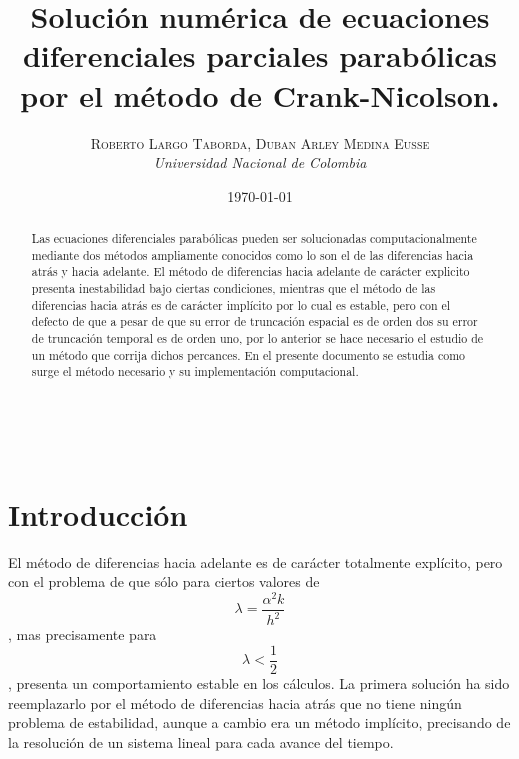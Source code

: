 \documentclass[11pt]{article} %
\title{\textbf{Solución numérica de ecuaciones diferenciales parciales parabólicas por el método de Crank-Nicolson.}\\ %
}
\author{\textsc{Roberto Largo Taborda, Duban Arley Medina Eusse} %
\\{\textit{Universidad Nacional de Colombia}}} %
\date{\today} %
\makeatletter
\renewcommand{\maketitle}{ %
\begin{flushright} %
{\LARGE\@title} %

\vspace{50pt} %

{\large\@author} %
\\\@date %

\vspace{40pt} %
\end{flushright}
}
\makeatother
\begin{document}
\maketitle %


\renewcommand{\abstractname}{Resumen} %

\begin{abstract}
Las ecuaciones diferenciales parabólicas pueden ser solucionadas computacionalmente mediante dos métodos ampliamente conocidos como lo son el de las diferencias hacia atrás y hacia adelante. El método de diferencias hacia adelante de carácter explicito presenta inestabilidad bajo ciertas condiciones, mientras que el método de las diferencias hacia atrás es de carácter implícito por lo cual es estable, pero con el defecto de que a pesar de que su error de truncación espacial es de orden dos su error de truncación temporal es de orden uno, por lo anterior se hace necesario el estudio de un método que corrija dichos percances. En el presente documento se estudia como surge el método necesario y su implementación computacional.
\end{abstract}


\vspace{30pt} %


\section*{Introducción}

El método de diferencias hacia adelante es de carácter totalmente explícito, pero con el problema de que sólo para ciertos valores de
\begin{equation}
\lambda =\frac{\alpha ^2 k}{h^2}
\end{equation}
, mas precisamente para
\begin{equation}
\lambda < \frac{1}{2}
\end{equation}, presenta un comportamiento estable en los cálculos. La primera solución ha sido reemplazarlo por el método de diferencias hacia atrás que no tiene ningún problema de estabilidad, aunque a cambio era un método implícito, precisando de la resolución de un sistema lineal para cada avance del tiempo.
\end{document}

